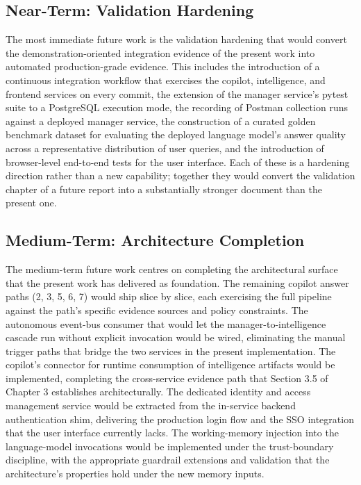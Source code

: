 \subsection*{Near-Term: Validation Hardening}
The most immediate future work is the validation hardening that would convert the demonstration-oriented integration evidence of the present work into automated production-grade evidence. This includes the introduction of a continuous integration workflow that exercises the copilot, intelligence, and frontend services on every commit, the extension of the manager service's pytest suite to a PostgreSQL execution mode, the recording of Postman collection runs against a deployed manager service, the construction of a curated golden benchmark dataset for evaluating the deployed language model's answer quality across a representative distribution of user queries, and the introduction of browser-level end-to-end tests for the user interface. Each of these is a hardening direction rather than a new capability; together they would convert the validation chapter of a future report into a substantially stronger document than the present one.

\subsection*{Medium-Term: Architecture Completion}
The medium-term future work centres on completing the architectural surface that the present work has delivered as foundation. The remaining copilot answer paths (2, 3, 5, 6, 7) would ship slice by slice, each exercising the full pipeline against the path's specific evidence sources and policy constraints. The autonomous event-bus consumer that would let the manager-to-intelligence cascade run without explicit invocation would be wired, eliminating the manual trigger paths that bridge the two services in the present implementation. The copilot's connector for runtime consumption of intelligence artifacts would be implemented, completing the cross-service evidence path that Section 3.5 of Chapter 3 establishes architecturally. The dedicated identity and access management service would be extracted from the in-service backend authentication shim, delivering the production login flow and the SSO integration that the user interface currently lacks. The working-memory injection into the language-model invocations would be implemented under the trust-boundary discipline, with the appropriate guardrail extensions and validation that the architecture's properties hold under the new memory inputs.

